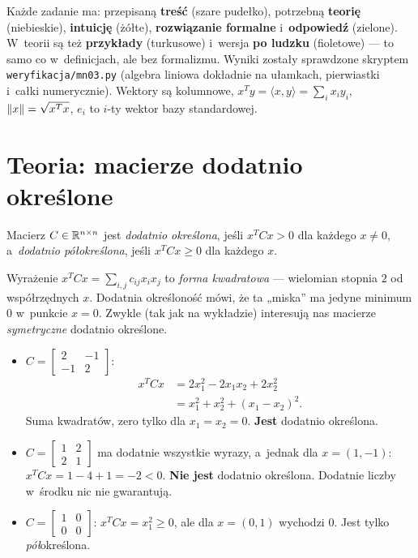 \documentclass[11pt]{article}
\begin{document}

\begin{teoria}
Każde zadanie ma: przepisaną \textbf{treść} (szare pudełko), potrzebną
\textbf{teorię} (niebieskie), \textbf{intuicję} (żółte), \textbf{rozwiązanie
formalne} i~\textbf{odpowiedź} (zielone). W~teorii są też
\textbf{przykłady} (turkusowe) i~wersja \textbf{po ludzku} (fioletowe) ---
to samo co w~definicjach, ale bez formalizmu. Wyniki zostały sprawdzone
skryptem \texttt{weryfikacja/mn03.py} (algebra liniowa dokładnie na
ułamkach, pierwiastki i~całki numerycznie). Wektory są kolumnowe,
$x^Ty=\langle x,y\rangle=\sum_ix_iy_i$, $\left\lVert x \right\rVert=\sqrt{x^Tx}$, $e_i$ to
$i$-ty wektor bazy standardowej.
\end{teoria}

\section{Teoria: macierze dodatnio określone}

\begin{definicja}
Macierz $C\in\mathbb{R}^{n\times n}$ jest \emph{dodatnio określona}, jeśli
$x^TCx>0$ dla każdego $x\ne0$, a~\emph{dodatnio półokreślona}, jeśli
$x^TCx\ge0$ dla każdego $x$.
\end{definicja}

Wyrażenie $x^TCx=\sum_{i,j}c_{ij}x_ix_j$ to \emph{forma kwadratowa} ---
wielomian stopnia $2$ od współrzędnych $x$. Dodatnia określoność mówi, że
ta „miska” ma jedyne minimum $0$ w~punkcie $x=0$. Zwykle (tak jak na
wykładzie) interesują nas macierze \emph{symetryczne} dodatnio określone.

\begin{przyklad}
\begin{itemize}
\item $C=\left[\begin{smallmatrix}2&-1\\-1&2\end{smallmatrix}\right]$:
\begin{align*}
x^TCx&=2x_1^2-2x_1x_2+2x_2^2\\
&=x_1^2+x_2^2+(x_1-x_2)^2.
\end{align*}
Suma kwadratów, zero tylko dla $x_1=x_2=0$. \textbf{Jest} dodatnio
określona.
\item $C=\left[\begin{smallmatrix}1&2\\2&1\end{smallmatrix}\right]$ ma
dodatnie wszystkie wyrazy, a~jednak dla $x=(1,-1)$:
$x^TCx=1-4+1=-2<0$. \textbf{Nie jest} dodatnio określona. Dodatnie
liczby w~środku nic nie gwarantują.
\item $C=\left[\begin{smallmatrix}1&0\\0&0\end{smallmatrix}\right]$:
$x^TCx=x_1^2\ge0$, ale dla $x=(0,1)$ wychodzi $0$. Jest tylko
\emph{pół}określona.
\end{itemize}
\end{przyklad}
\end{document}
